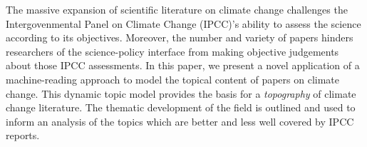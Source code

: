 \documentclass{article}
\begin{document}
	The massive expansion of scientific literature on climate change challenges the Intergovenmental Panel on Climate Change (IPCC)'s ability to assess the science according to its objectives.
	Moreover, the number and variety of papers hinders researchers of the science-policy interface from making objective judgements about those IPCC assessments. In this paper, we present a novel application of a machine-reading approach to model the topical content of papers on climate change. This dynamic topic model provides the basis for a \textit{topography} of climate change literature. The thematic development of the field is outlined and used to inform an analysis of the topics which are better and less well covered by IPCC reports.
\end{document}
